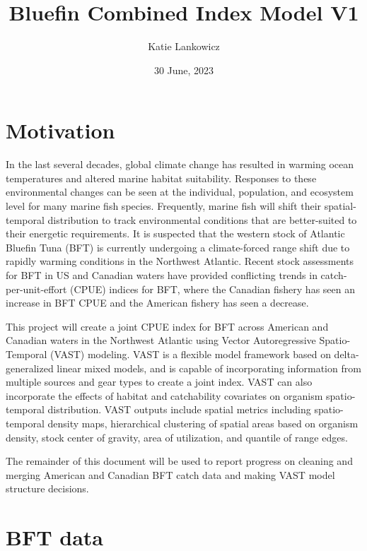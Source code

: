 \documentclass[
]{article}
\title{Bluefin Combined Index Model V1}
\author{Katie Lankowicz}
\date{30 June, 2023}
\begin{document}
\maketitle

{
\hypersetup{linkcolor=}
\setcounter{tocdepth}{2}
\tableofcontents
}
\hypertarget{motivation}{%
\section{Motivation}\label{motivation}}

In the last several decades, global climate change has resulted in warming ocean temperatures and altered marine habitat suitability. Responses to these environmental changes can be seen at the individual, population, and ecosystem level for many marine fish species. Frequently, marine fish will shift their spatial-temporal distribution to track environmental conditions that are better-suited to their energetic requirements. It is suspected that the western stock of Atlantic Bluefin Tuna (BFT) is currently undergoing a climate-forced range shift due to rapidly warming conditions in the Northwest Atlantic. Recent stock assessments for BFT in US and Canadian waters have provided conflicting trends in catch-per-unit-effort (CPUE) indices for BFT, where the Canadian fishery has seen an increase in BFT CPUE and the American fishery has seen a decrease.

This project will create a joint CPUE index for BFT across American and Canadian waters in the Northwest Atlantic using Vector Autoregressive Spatio-Temporal (VAST) modeling. VAST is a flexible model framework based on delta-generalized linear mixed models, and is capable of incorporating information from multiple sources and gear types to create a joint index. VAST can also incorporate the effects of habitat and catchability covariates on organism spatio-temporal distribution. VAST outputs include spatial metrics including spatio-temporal density maps, hierarchical clustering of spatial areas based on organism density, stock center of gravity, area of utilization, and quantile of range edges.

The remainder of this document will be used to report progress on cleaning and merging American and Canadian BFT catch data and making VAST model structure decisions.

\hypertarget{bft-data}{%
\section{BFT data}\label{bft-data}}
\end{document}
